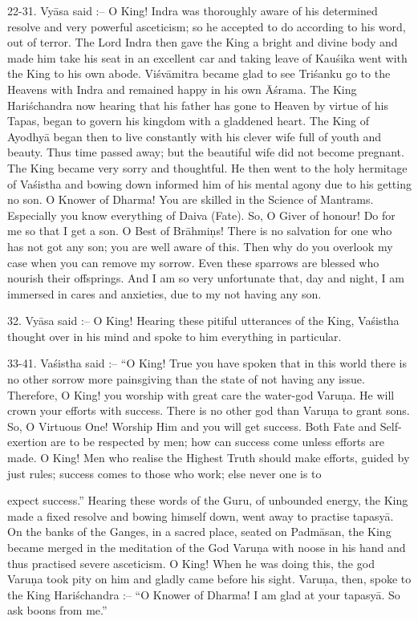 22-31. Vy\=asa said :-- O King! Indra was thoroughly aware of his determined resolve and very powerful asceticism; so he accepted to do according to his word, out of terror. The Lord Indra then gave the King a bright and divine body and made him take his seat in an excellent car and taking leave of Kau\'sika went with the King to his own abode. Vi\'sv\=amitra became glad to see Tri\'sanku go to the Heavens with Indra and remained happy in his own \=A\'srama. The King Hari\'schandra now hearing that his father has gone to Heaven by virtue of his Tapas, began to govern his kingdom with a gladdened heart. The King of Ayodhy\=a began then to live constantly with his clever wife full of youth and beauty. Thus time passed away; but the beautiful wife did not become pregnant. The King became very sorry and thoughtful. He then went to the holy hermitage of Va\'sistha and bowing down informed him of his mental agony due to his getting no son. O Knower of Dharma! You are skilled in the Science of Mantrams. Especially you know everything of Daiva (Fate). So, O Giver of honour! Do for me so that I get a son. O Best of Br\=ahmi\d{n}s! There is no salvation for one who has not got any son; you are well aware of this. Then why do you overlook my case when you can remove my sorrow. Even these sparrows are blessed who nourish their offsprings. And I am so very unfortunate that, day and night, I am immersed in cares and anxieties, due to my not having any son.

32. Vy\=asa said :-- O King! Hearing these pitiful utterances of the King, Va\'sistha thought over in his mind and spoke to him everything in particular.

33-41. Va\'sistha said :-- ``O King! True you have spoken that in this world there is no other sorrow more painsgiving than the state of not having any issue. Therefore, O King! you worship with great care the water-god Varu\d{n}a. He will crown your efforts with success. There is no other god than Varu\d{n}a to grant sons. So, O Virtuous One! Worship Him and you will get success. Both Fate and Self-exertion are to be respected by men; how can success come unless efforts are made. O King! Men who realise the Highest Truth should make efforts, guided by just rules; success comes to those who work; else never one is to

expect success.'' Hearing these words of the Guru, of unbounded energy, the King made a fixed resolve and bowing himself down, went away to practise tapasy\=a. On the banks of the Ganges, in a sacred place, seated on Padm\=asan, the King became merged in the meditation of the God Varu\d{n}a with noose in his hand and thus practised severe asceticism. O King! When he was doing this, the god Varu\d{n}a took pity on him and gladly came before his sight. Varu\d{n}a, then, spoke to the King Hari\'schandra :-- ``O Knower of Dharma! I am glad at your tapasy\=a. So ask boons from me.''


